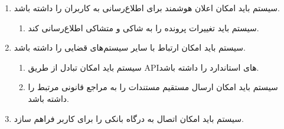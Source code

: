 \documentclass[12pt,a4paper,oneside]{article}
\begin{document}
\begin{itemize}
\begin{enumerate}
        \item 
        سیستم باید امکان اعلان هوشمند برای اطلاع‌رسانی به کاربران را داشته باشد.
        \begin{enumerate}
            \renewcommand{\labelenumii}{\textbf{.R\arabic{enumi}.\arabic{enumii}}}
            \item 
            سیستم باید تغییرات پرونده را به شاکی و متشاکی اطلاع‌رسانی کند.
        \end{enumerate}

        \item 
        سیستم باید امکان ارتباط با سایر سیستم‌های قضایی را داشته باشد.
        \begin{enumerate}
            \renewcommand{\labelenumii}{\textbf{.R\arabic{enumi}.\arabic{enumii}}}
            \item 
            سیستم باید امکان تبادل از طریق APIهای استاندارد را داشته باشد.
            \item 
            سیستم باید امکان ارسال مستقیم مستندات را به مراجع قانونی مرتبط را داشته باشد.
        \end{enumerate}

        \item 
        سیستم باید امکان اتصال به درگاه بانکی را برای کاربر فراهم سازد.
    \end{enumerate}
\end{itemize}
\end{document}
